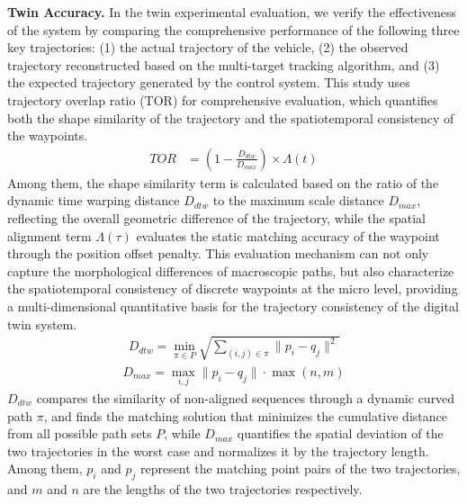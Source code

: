 \documentclass[lettersize,journal]{IEEEtran}
\begin{document}
\textbf{Twin Accuracy.}
In the twin experimental evaluation, we verify the effectiveness of the system by comparing the comprehensive performance of the following three key trajectories: (1) the actual trajectory of the vehicle, (2) the observed trajectory reconstructed based on the multi-target tracking algorithm, and (3) the expected trajectory generated by the control system.
This study uses trajectory overlap ratio (TOR) for comprehensive evaluation, which quantifies both the shape similarity of the trajectory and the spatiotemporal consistency of the waypoints.
\begin{align}
	TOR & = \left(1 - \frac{D_{dtw}}{D_{max}}\right) \times \Lambda(t)
\end{align}
Among them, the shape similarity term is calculated based on the ratio of the dynamic time warping distance \(D_{dtw}\) to the maximum scale distance \(D_{max}\), reflecting the overall geometric difference of the trajectory, while the spatial alignment term \(\Lambda(\tau)\) evaluates the static matching accuracy of the waypoint through the position offset penalty.
This evaluation mechanism can not only capture the morphological differences of macroscopic paths, but also characterize the spatiotemporal consistency of discrete waypoints at the micro level, providing a multi-dimensional quantitative basis for the trajectory consistency of the digital twin system.
\begin{align}
	D_{dtw} = \min_{\pi \in P} \sqrt{\sum_{(i,j)\in\pi} \|p_i - q_j\|^2}
\end{align}
\begin{align}
	D_{max} = \max_{i,j} \|p_i - q_j\| \cdot \max(n,m)
\end{align}
\(D_{dtw}\) compares the similarity of non-aligned sequences through a dynamic curved path \(\pi\), and finds the matching solution that minimizes the cumulative distance from all possible path sets \(P\), while \(D_{max}\) quantifies the spatial deviation of the two trajectories in the worst case and normalizes it by the trajectory length. Among them, \(p_{i}\) and \(p_{j}\) represent the matching point pairs of the two trajectories, and \(m\) and \(n\) are the lengths of the two trajectories respectively.
\end{document}
